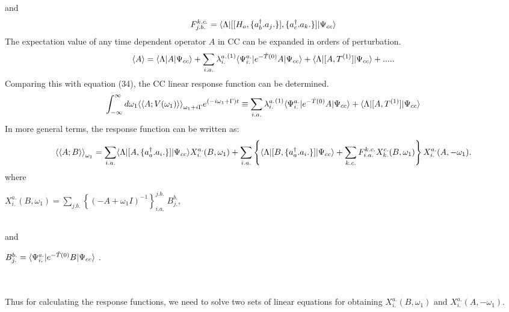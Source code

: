 and 
\begin{equation}
F^{k.c.}_{j.b.} = \langle \Lambda |\lbrack\lbrack H_o,\{{a}^\dagger_b.a_j.\}\rbrack,\{{a}^\dagger_c.a_k.\}\rbrack| \Psi_{cc} \rangle  
\end{equation}
The expectation value of any time dependent operator $A$ in CC can be expanded in orders of perturbation.
\begin{equation}
\langle A \rangle = \langle \Lambda |A| \Psi_{cc} \rangle + \sum_{i.a.}{\lambda^{a.}_{i.}}^{(1)}\langle \Psi^{a.}_{i.} |e^{-\hat{T}(0)}A| \Psi_{cc} \rangle + \langle \Lambda |\lbrack A,T^{(1)}\rbrack| \Psi_{cc} \rangle + .....
\end{equation}
Comparing this with equation (34), the CC linear response function can be determined.
\begin{equation}
\int_{-\infty}^{\infty}d\omega_1{\langle\langle A;V(\omega_1)\rangle\rangle}_{\omega_1 + i \Gamma}e^{(-i\omega_1 + \Gamma)t} \equiv \sum_{i.a.}{\lambda^{a.}_{i.}}^{(1)}\langle \Psi^{a.}_{i.} |e^{-\hat{T}(0)}A| \Psi_{cc} \rangle + \langle \Lambda |\lbrack A,T^{(1)}\rbrack| \Psi_{cc} \rangle
\end{equation}
In more general terms, the response function can be written as:
\begin{equation}
{\langle\langle A;B\rangle\rangle}_{\omega_1} = \sum_{i.a.} \langle \Lambda |\lbrack A,\{{a}^\dagger_a.a_i.\}\rbrack|  \Psi_{cc} \rangle{X^{a.}_{i.}}(B,\omega_1) + \sum_{i.a.}\left\{\langle \Lambda |\lbrack B,\{{a}^\dagger_a.a_i.\}\rbrack| \Psi_{cc} \rangle + \sum_{k.c.}F^{k.c.}_{i.a.}{X^{c.}_{k.}}(B,\omega_1)\right\}{X^{a.}_{i.}}(A,-\omega_1).
\end{equation}
where \centerline{${X^{a.}_{i.}}(B,\omega_1) = \sum_{j.b.}\left\{ {( -A + \omega_1I)}^{-1}\right\}^{j.b.}_{i.a.}\;B^{b.}_{j.},$}\\and \centerline{ $B^{b.}_{j.} = \langle \Psi^{a.}_{i.} |e^{-\hat{T}(0)}B| \Psi_{cc} \rangle$ .}\\\\
Thus for calculating the response functions, we need to solve two sets of
linear equations for obtaining ${X^{a.}_{i.}}(B,\omega_1)$ and
${X^{a.}_{i.}}(A,-\omega_1)$.
